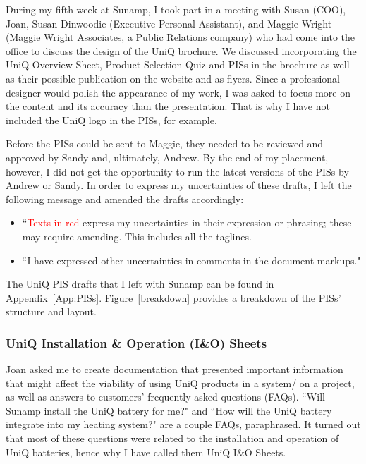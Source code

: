 During my fifth week at Sunamp, I took part in a meeting with Susan (COO), Joan, Susan Dinwoodie (Executive Personal Assistant), and Maggie Wright (Maggie Wright Associates, a Public Relations company)
who had come into the office to discuss the design of the UniQ brochure.
We discussed incorporating the UniQ Overview Sheet, Product Selection Quiz and PISs in the brochure as well as their possible publication on the website and as flyers.
Since a professional designer would polish the appearance of my work, I was asked to focus more on the content and its accuracy than the presentation.
That is why I have not included the UniQ logo in the PISs, for example.

Before the PISs could be sent to Maggie, they needed to be reviewed and approved by Sandy and, ultimately, Andrew.
By the end of my placement, however, I did not get the opportunity to run the latest versions of the PISs by Andrew or Sandy.
In order to express my uncertainties of these drafts, I left the following message and amended the drafts accordingly:
\begin{itemize}
    \item ``\textcolor{red}{Texts in red} express my uncertainties in their expression or phrasing; these may require amending. This includes all the taglines.
    \item ``I have expressed other uncertainties in comments in the document markups."
\end{itemize}

The UniQ PIS drafts that I left with Sunamp can be found in Appendix~\ref{App:PISs}.
Figure~\ref{breakdown} provides a breakdown of the PISs' structure and layout.



\subsubsection{UniQ Installation \& Operation (I\&O) Sheets}

Joan asked me to create documentation that presented important information that might affect the viability of using UniQ products in a system/ on a project, as well as answers to customers' frequently asked questions (FAQs).
``Will Sunamp install the UniQ battery for me?" and ``How will the UniQ battery integrate into my heating system?" are a couple FAQs, paraphrased.
It turned out that most of these questions were related to the installation and operation of UniQ batteries, hence why I have called them UniQ I\&O Sheets.

